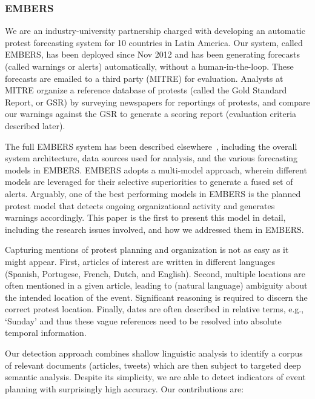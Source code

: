 \documentclass[letterpaper]{article}
\begin{document}
\vspace{-0.5em}
\subsubsection{EMBERS}
We are an industry-university partnership charged with developing an
automatic protest forecasting system for 10 countries in
Latin America. Our system, called EMBERS, has been
deployed since Nov 2012 and has been generating forecasts (called
warnings or alerts) automatically, without a human-in-the-loop. These forecasts are emailed to
a third party (MITRE) for evaluation. Analysts at MITRE organize a reference
database of protests (called the Gold Standard Report,
or GSR) by surveying newspapers for reportings of protests, and
compare our warnings against the GSR to generate a scoring report (evaluation
criteria described later).

The full EMBERS system has been described elsewhere~\cite{emberskdd}, including
the overall system architecture, data sources used for analysis, and the
various forecasting models in EMBERS. EMBERS adopts a multi-model approach,
wherein different models are leveraged for their selective superiorities
to generate a fused set of alerts. Arguably, one of the
best performing models in EMBERS is the planned protest model that detects
ongoing organizational activity and generates warnings accordingly. This paper
is the first to present this model in detail, including the 
research issues involved, and how we addressed them in EMBERS.

Capturing mentions of protest planning and organization 
is not as easy as it might appear. First, articles of interest are written in
different languages (Spanish, Portugese, French, Dutch, and English). 
Second, multiple locations are often mentioned in a given article, leading
to (natural language) ambiguity about the intended location of the event.
Significant reasoning is required to discern the correct protest location.
Finally, dates are often described in relative terms, e.g., `Sunday' and 
thus these vague references need to be resolved into absolute temporal
information. 

Our detection approach 
combines shallow linguistic analysis to identify a corpus of relevant
documents (articles, tweets) which are then subject to targeted deep semantic analysis.
Despite its simplicity, we are able to
detect indicators of event planning with surprisingly high
accuracy. Our contributions are:

\end{document}
